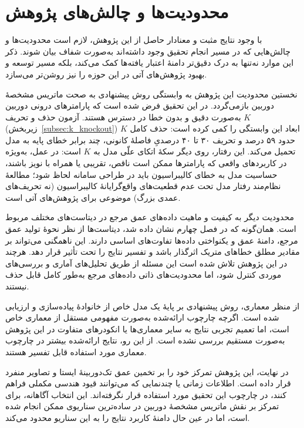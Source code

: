 \section{محدودیت‌ها و چالش‌های پژوهش}
\label{sec:chapter5_limitations}

با وجود نتایج مثبت و معنادار حاصل از این پژوهش،
لازم است محدودیت‌ها و چالش‌هایی که
در مسیر انجام تحقیق وجود داشته‌اند
به‌صورت شفاف بیان شوند.
ذکر این موارد نه‌تنها به درک دقیق‌تر
دامنهٔ اعتبار یافته‌ها کمک می‌کند،
بلکه مسیر توسعه و بهبود پژوهش‌های آتی
در این حوزه را نیز روشن‌تر می‌سازد.

نخستین محدودیت این پژوهش
به وابستگی روش پیشنهادی به صحت
ماتریس مشخصهٔ دوربین بازمی‌گردد.
در این تحقیق فرض شده است که
پارامترهای درونی دوربین
به‌صورت دقیق و بدون خطا در دسترس هستند.
آزمون حذف و تحریف $K$ (زیربخش~\ref{subsec:k_knockout})
ابعاد این وابستگی را کمی کرده است:
حذف کامل $K$ حدود ۵۹ درصد و تحریف ۳۰ تا ۴۰ درصدیِ
فاصلهٔ کانونی، چند برابر خطای پایه به مدل تحمیل می‌کند.
این رفتار، روی دیگر سکهٔ اتکای علّی مدل به $K$ است:
در عمل، به‌ویژه در کاربردهای واقعی که پارامترها ممکن است
ناقص، تقریبی یا همراه با نویز باشند،
حساسیت مدل به خطای کالیبراسیون باید در طراحی سامانه لحاظ شود؛
مطالعهٔ نظام‌مند رفتار مدل تحت عدم قطعیت‌های واقع‌گرایانهٔ کالیبراسیون
(نه تحریف‌های عمدی بزرگ)
موضوعی برای پژوهش‌های آتی است.

محدودیت دیگر به کیفیت و ماهیت
داده‌های عمق مرجع در دیتاست‌های مختلف مربوط است.
همان‌گونه که در فصل چهارم نشان داده شد،
دیتاست‌ها از نظر نحوهٔ تولید عمق مرجع،
دامنهٔ عمق و یکنواختی داده‌ها
تفاوت‌های اساسی دارند.
این ناهمگنی می‌تواند
بر مقادیر مطلق خطاهای متریک اثرگذار باشد
و تفسیر نتایج را تحت تأثیر قرار دهد.
هرچند در این پژوهش تلاش شده است
این مسئله از طریق تحلیل‌های آماری
و بررسی‌های موردی کنترل شود،
اما محدودیت‌های ذاتی داده‌های مرجع
به‌طور کامل قابل حذف نیستند.

از منظر معماری،
روش پیشنهادی بر پایهٔ یک مدل خاص
از خانوادهٔ 
پیاده‌سازی و ارزیابی شده است.
اگرچه چارچوب ارائه‌شده
به‌صورت مفهومی مستقل از معماری خاص است،
اما تعمیم تجربی نتایج به سایر معماری‌ها
یا انکودرهای متفاوت
در این پژوهش به‌صورت مستقیم بررسی نشده است.
از این رو،
نتایج ارائه‌شده
بیشتر در چارچوب معماری مورد استفاده
قابل تفسیر هستند.

در نهایت،
این پژوهش تمرکز خود را
بر تخمین عمق تک‌دوربینهٔ ایستا
و تصاویر منفرد قرار داده است.
اطلاعات زمانی یا چندنمایی
که می‌توانند قیود هندسی مکملی فراهم کنند،
در چارچوب این تحقیق مورد استفاده قرار نگرفته‌اند.
این انتخاب آگاهانه،
برای تمرکز بر نقش ماتریس مشخصهٔ دوربین
در ساده‌ترین سناریوی ممکن انجام شده است،
اما در عین حال دامنهٔ کاربرد نتایج
را به این سناریو محدود می‌کند.

